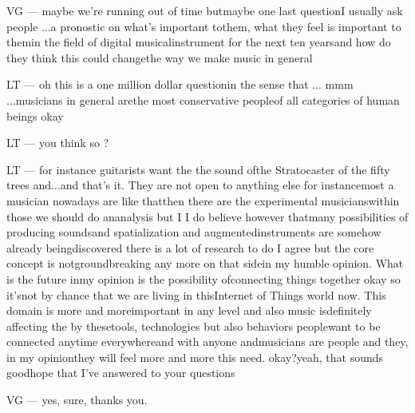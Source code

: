 VG — maybe we're running out of time butmaybe one last questionI usually ask people ...a pronostic on what's important tothem, what they feel is important to themin the field of digital musicalinstrument for the next ten yearsand how do they think this could changethe way we make music in general

LT — oh this is a one million dollar questionin the sense that ... mmm ...musicians in general arethe most conservative peopleof all categories of human beings okay

LT — you think so ?

LT — for instance guitarists want the the sound ofthe Stratocaster of the fifty trees and...and that's it. They are not open to anything else for instancemost a musician nowadays are like thatthen there are the experimental musicianswithin those we should do ananalysis but I I do believe however thatmany possibilities of producing soundsand spatialization and augmentedinstruments are somehow already beingdiscovered there is a lot of research to do I agree but the core concept is notgroundbreaking any more on that sidein my humble opinion. What is the future inmy opinion is the possibility ofconnecting things together okay so it'snot by chance that we are living in thisInternet of Things world now. This domain is more and moreimportant in any level and also music isdefinitely affecting the by thesetools, technologies but also behaviors peoplewant to be connected anytime everywhereand with anyone andmusicians are people and they, in my opinionthey will feel more and more this need. okay?yeah, that sounds goodhope that I've answered to your questions

VG — yes, sure, thanks you.
